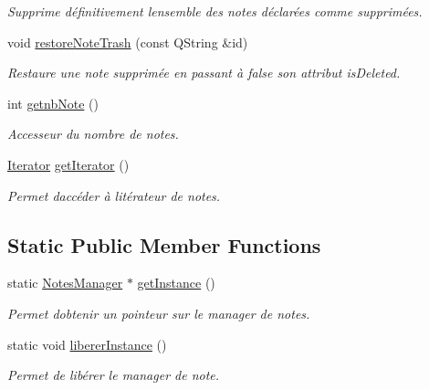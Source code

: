 \begin{DoxyCompactItemize}
\begin{DoxyCompactList}\small\item\em Supprime définitivement l\textquotesingle{}ensemble des notes déclarées comme supprimées. \end{DoxyCompactList}\item 
void \hyperlink{class_notes_manager_abc6587a5d3986ae674e5dd4b9044f348}{restore\+Note\+Trash} (const Q\+String \&id)
\begin{DoxyCompactList}\small\item\em Restaure une note supprimée en passant à false son attribut is\+Deleted. \end{DoxyCompactList}\item 
\mbox{\label{class_notes_manager_a9cab39a524fd23c6523f895e81f75028}} 
int \hyperlink{class_notes_manager_a9cab39a524fd23c6523f895e81f75028}{getnb\+Note} ()
\begin{DoxyCompactList}\small\item\em Accesseur du nombre de notes. \end{DoxyCompactList}\item 
\mbox{\label{class_notes_manager_a4907351a20cc85b1fe0327ac1b15c7da}} 
\hyperlink{class_notes_manager_1_1_iterator}{Iterator} \hyperlink{class_notes_manager_a4907351a20cc85b1fe0327ac1b15c7da}{get\+Iterator} ()
\begin{DoxyCompactList}\small\item\em Permet d\textquotesingle{}accéder à l\textquotesingle{}itérateur de notes. \end{DoxyCompactList}\end{DoxyCompactItemize}
\subsection*{Static Public Member Functions}
\begin{DoxyCompactItemize}
\item 
\mbox{\label{class_notes_manager_ad1a91e51ba8506c7ae7cd60d06bd075f}} 
static \hyperlink{class_notes_manager}{Notes\+Manager} $\ast$ \hyperlink{class_notes_manager_ad1a91e51ba8506c7ae7cd60d06bd075f}{get\+Instance} ()
\begin{DoxyCompactList}\small\item\em Permet d\textquotesingle{}obtenir un pointeur sur le manager de notes. \end{DoxyCompactList}\item 
\mbox{\label{class_notes_manager_abd12bae3c990a408e9ef55aa0d93b675}} 
static void \hyperlink{class_notes_manager_abd12bae3c990a408e9ef55aa0d93b675}{liberer\+Instance} ()
\begin{DoxyCompactList}\small\item\em Permet de libérer le manager de note. \end{DoxyCompactList}\end{DoxyCompactItemize}


